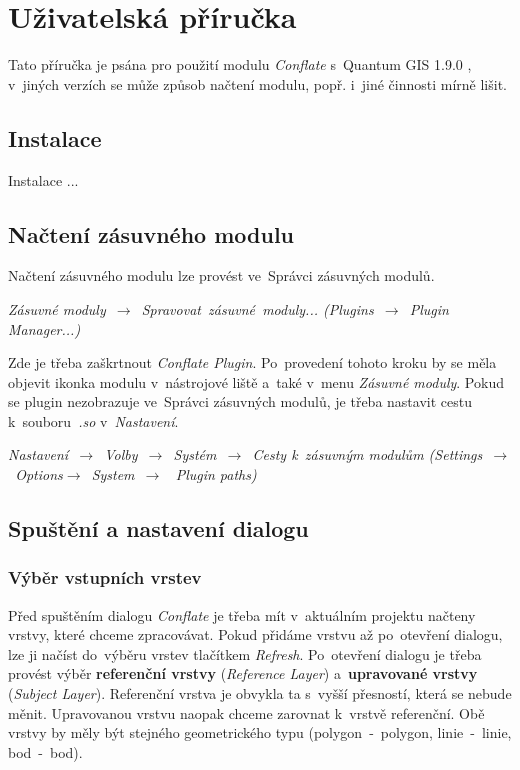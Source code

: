 
\newpage
\chapter{Uživatelská příručka}
\label{priloha-prirucka}

Tato příručka je psána pro použití modulu \textit{Conflate} s~Quantum GIS 1.9.0 , 
v~jiných verzích se může způsob načtení modulu, popř. i~jiné činnosti mírně lišit.

\section{Instalace}
\label{prirucka-instalace}
Instalace ... %

\section{Načtení zásuvného modulu}
\label{prirucka-nacteni}

Načtení zásuvného modulu lze provést ve~Správci zásuvných modulů.
\begin{center}
\textit{Zásuvné moduly~$\rightarrow$~Spravovat~zásuvné~moduly... 
(Plugins~$\rightarrow$~Plugin Manager...)}
\end{center}
Zde je třeba zaškrtnout \textit{Conflate Plugin}. Po~provedení tohoto kroku by se 
měla objevit ikonka modulu v~nástrojové liště a~také v~menu \textit{Zásuvné moduly}. 
Pokud se plugin nezobrazuje ve~Správci zásuvných modulů, je třeba nastavit cestu 
k~souboru~\textit{.so} v~\textit{Nastavení}.
\begin{center} 
\textit{Nastavení~$\rightarrow$~Volby~$\rightarrow$~Systém~$\rightarrow$~Cesty 
k~zásuvným modulům (Settings~$\rightarrow$~Options$\rightarrow$~System~$\rightarrow$
~Plugin paths)}
\end{center}


\section{Spuštění a nastavení dialogu}
\label{prirucka-spusteni}

\subsection{Výběr vstupních vrstev}
Před spuštěním dialogu \textit{Conflate} je třeba mít v~aktuálním projektu 
načteny vrstvy, které chceme zpracovávat. Pokud přidáme vrstvu až po~otevření
dialogu, lze ji načíst do~výběru vrstev tlačítkem \textit{Refresh}.
Po~otevření dialogu je třeba provést výběr \textbf{re\-ferenční vrstvy} 
(\textit{Reference Layer}) a~\textbf{upravované vrstvy} (\textit{Subject Layer}). 
Re\-ferenční vrstva je obvykla ta s~vyšší přesností, která se nebude měnit. 
Upravovanou vrstvu naopak chceme zarovnat k~vrstvě referenční. 
Obě vrstvy by měly být stejného geometrického typu (polygon~-~polygon, 
linie~-~linie, bod~-~bod).

